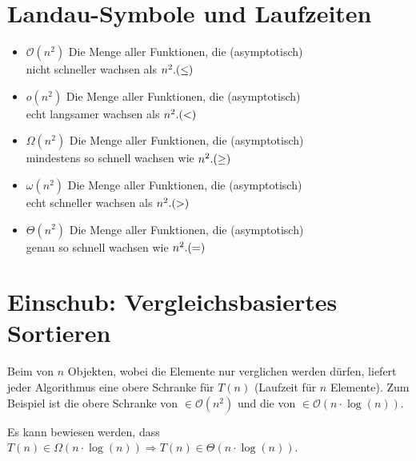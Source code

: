 \documentclass{scrartcl}%
\begin{document}

    \section*{Landau-Symbole und Laufzeiten}
    \label{subsec:laufzeiten}

    \begin{itemize}
        \item $\mathcal{O}(n^2)$ Die Menge aller Funktionen, die (asymptotisch)\\
        nicht schneller wachsen als $n^2.\hfill (\leq)$
        \item $o(n^2)$ Die Menge aller Funktionen, die (asymptotisch)\\
        echt langsamer wachsen als $n^2.\hfill (<)$
        \item $\Omega(n^2)$ Die Menge aller Funktionen, die (asymptotisch)\\
        mindestens so schnell wachsen wie $n^2.\hfill (\geq)$
        \item $\omega(n^2)$ Die Menge aller Funktionen, die (asymptotisch)\\
        echt schneller wachsen als $n^2.\hfill (>)$
        \item $\Theta(n^2)$ Die Menge aller Funktionen, die (asymptotisch)\\
        genau so schnell wachsen wie $n^2.\hfill (=)$
    \end{itemize}

    \section*{Einschub: Vergleichsbasiertes Sortieren}
    \label{subsec:vergleichsbasiertessortieren}

    Beim  von $n$ Objekten,
    wobei die Elemente nur verglichen werden dürfen,
    liefert jeder Algorithmus eine obere Schranke für $T(n)$ (Laufzeit für $n$ Elemente).
    Zum Beispiel ist die obere Schranke von  $\in \mathcal{O}(n^2)$
    und die von  $\in \mathcal{O}(n \cdot \log(n))$.

    \begin{satz}
        Es kann bewiesen werden, dass $T(n) \in \Omega(n \cdot \log(n)) \Rightarrow T(n) \in \Theta(n \cdot \log(n))$.
    \end{satz}
\end{document}
